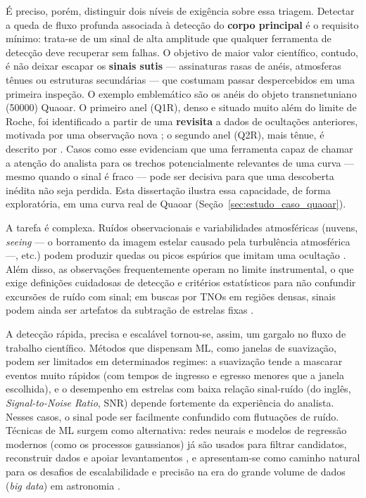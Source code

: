 É preciso, porém, distinguir dois níveis de exigência sobre essa triagem. Detectar a queda de fluxo profunda associada à detecção do \textbf{corpo principal} é o requisito mínimo: trata-se de um sinal de alta amplitude que qualquer ferramenta de detecção deve recuperar sem falhas. O objetivo de maior valor científico, contudo, é não deixar escapar os \textbf{sinais sutis} --- assinaturas rasas de anéis, atmosferas tênues ou estruturas secundárias --- que costumam passar despercebidos em uma primeira inspeção. O exemplo emblemático são os anéis do objeto transnetuniano (50000) Quaoar. O primeiro anel (Q1R), denso e situado muito além do limite de Roche, foi identificado a partir de uma \textbf{revisita} a dados de ocultações anteriores, motivada por uma observação nova \citep{Morgado2023}; o segundo anel (Q2R), mais tênue, é descrito por \citet{Quaoar2023}. Casos como esse evidenciam que uma ferramenta capaz de chamar a atenção do analista para os trechos potencialmente relevantes de uma curva --- mesmo quando o sinal é fraco --- pode ser decisiva para que uma descoberta inédita não seja perdida. Esta dissertação ilustra essa capacidade, de forma exploratória, em uma curva real de Quaoar (Seção~\ref{sec:estudo_caso_quaoar}).

A tarefa é complexa. Ruídos observacionais e variabilidades atmosféricas (nuvens, \textit{seeing} --- o borramento da imagem estelar causado pela turbulência atmosférica ---, etc.) podem produzir quedas ou picos espúrios que imitam uma ocultação \citep{Cazeneuve2023, Knieling2024}. Além disso, as observações frequentemente operam no limite instrumental, o que exige definições cuidadosas de detecção e critérios estatísticos para não confundir excursões de ruído com sinal; em buscas por TNOs em regiões densas, sinais podem ainda ser artefatos da subtração de estrelas fixas \citep{Fraser2024}.

A detecção rápida, precisa e escalável tornou-se, assim, um gargalo no fluxo de trabalho científico. Métodos que dispensam ML, como janelas de suavização, podem ser limitados em determinados regimes: a suavização tende a mascarar eventos muito rápidos (com tempos de ingresso e egresso menores que a janela escolhida), e o desempenho em estrelas com baixa relação sinal-ruído (do inglês, \textit{Signal-to-Noise Ratio}, SNR) depende fortemente da experiência do analista. Nesses casos, o sinal pode ser facilmente confundido com flutuações de ruído. Técnicas de ML surgem como alternativa: redes neurais e modelos de regressão modernos (como os processos gaussianos) já são usados para filtrar candidatos, reconstruir dados e apoiar levantamentos \citep{Deisenroth2019, Fraser2024, CarleoMLPhysSci}, e apresentam-se como caminho natural para os desafios de escalabilidade e precisão na era do grande volume de dados (\textit{big data}) em astronomia \citep{Cazeneuve2023}.


